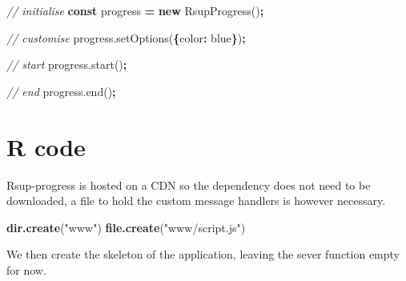 \documentclass[
]{krantz}
\makeatletter
\newenvironment{Shaded}{\begin{snugshade}}{\end{snugshade}}
\newcommand{\AttributeTok}[1]{\textcolor[rgb]{0.61,0.61,0.61}{#1}}
\newcommand{\CommentTok}[1]{\textcolor[rgb]{0.37,0.37,0.37}{\textit{#1}}}
\newcommand{\DataTypeTok}[1]{\textcolor[rgb]{0.27,0.27,0.27}{#1}}
\newcommand{\KeywordTok}[1]{\textcolor[rgb]{0.27,0.27,0.27}{\textbf{#1}}}
\newcommand{\NormalTok}[1]{#1}
\newcommand{\OperatorTok}[1]{\textcolor[rgb]{0.43,0.43,0.43}{\textbf{#1}}}
\newcommand{\StringTok}[1]{\textcolor[rgb]{0.5,0.5,0.5}{#1}}
\newcommand{\VariableTok}[1]{\textcolor[rgb]{0,0,0}{#1}}
\newenvironment{kframe}{%
\medskip{}
\setlength{\fboxsep}{.8em}
 \def\at@end@of@kframe{}%
 \ifinner\ifhmode%
  \def\at@end@of@kframe{\end{minipage}}%
  \begin{minipage}{\columnwidth}%
 \fi\fi%
 \def\FrameCommand##1{\hskip\@totalleftmargin \hskip-\fboxsep
 \colorbox{shadecolor}{##1}\hskip-\fboxsep
     \hskip-\linewidth \hskip-\@totalleftmargin \hskip\columnwidth}%
 \MakeFramed {\advance\hsize-\width
   \@totalleftmargin\z@ \linewidth\hsize
   \@setminipage}}%
 {\par\unskip\endMakeFramed%
 \at@end@of@kframe}
\renewenvironment{Shaded}{\begin{kframe}}{\end{kframe}}
\makeatother
\begin{document}
\begin{Shaded}
\begin{Highlighting}[]
\CommentTok{// initialise}
\KeywordTok{const}\NormalTok{ progress }\OperatorTok{=} \KeywordTok{new} \AttributeTok{RsupProgress}\NormalTok{()}\OperatorTok{;}

\CommentTok{// customise}
\VariableTok{progress}\NormalTok{.}\AttributeTok{setOptions}\NormalTok{(}\OperatorTok{\{}\DataTypeTok{color}\OperatorTok{:} \StringTok{\textquotesingle{}blue\textquotesingle{}}\OperatorTok{\}}\NormalTok{)}\OperatorTok{;}

\CommentTok{// start}
\VariableTok{progress}\NormalTok{.}\AttributeTok{start}\NormalTok{()}\OperatorTok{;}

\CommentTok{// end}
\VariableTok{progress}\NormalTok{.}\AttributeTok{end}\NormalTok{()}\OperatorTok{;}
\end{Highlighting}
\end{Shaded}

\hypertarget{r-code}{%
\section{R code}\label{r-code}}

Rsup-progress is hosted on a CDN so the dependency does not need to be downloaded, a file to hold the custom message handlers is however necessary.

\begin{Shaded}
\begin{Highlighting}[]
\KeywordTok{dir.create}\NormalTok{(}\StringTok{"www"}\NormalTok{)}
\KeywordTok{file.create}\NormalTok{(}\StringTok{"www/script.js"}\NormalTok{)}
\end{Highlighting}
\end{Shaded}

We then create the skeleton of the application, leaving the sever function empty for now.
\end{document}
